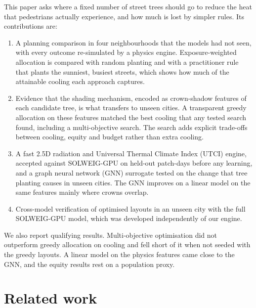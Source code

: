 \documentclass[preprint,12pt,authoryear]{elsarticle}
\begin{document}
This paper asks where a fixed number of street trees should go to reduce the heat that pedestrians actually experience, and how much is lost by simpler rules. Its contributions are:
\begin{enumerate}
  \item A planning comparison in four neighbourhoods that the models had not seen, with every outcome re-simulated by a physics engine. Exposure-weighted allocation is compared with random planting and with a practitioner rule that plants the sunniest, busiest streets, which shows how much of the attainable cooling each approach captures.
  \item Evidence that the shading mechanism, encoded as crown-shadow features of each candidate tree, is what transfers to unseen cities. A transparent greedy allocation on these features matched the best cooling that any tested search found, including a multi-objective search. The search adds explicit trade-offs between cooling, equity and budget rather than extra cooling.
  \item A fast 2.5D radiation and Universal Thermal Climate Index (UTCI) engine, accepted against SOLWEIG-GPU on held-out patch-days before any learning, and a graph neural network (GNN) surrogate tested on the change that tree planting causes in unseen cities. The GNN improves on a linear model on the same features mainly where crowns overlap.
  \item Cross-model verification of optimised layouts in an unseen city with the full SOLWEIG-GPU model, which was developed independently of our engine.
\end{enumerate}
We also report qualifying results. Multi-objective optimisation did not outperform greedy allocation on cooling and fell short of it when not seeded with the greedy layouts. A linear model on the physics features came close to the GNN, and the equity results rest on a population proxy.

\section{Related work}\label{sec:related}
\end{document}
